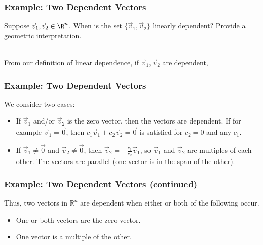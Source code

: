 \begin{frame}
\frametitle{Example: Two Dependent Vectors}

    Suppose $\vec v_1, \vec v_2 \in \R^n$. When is the set $\{\vec v_1, \vec v_2\}$ linearly dependent? Provide a geometric interpretation.
    
    \pause 
    
    \vspace{12pt}
    
     \\
    From our definition of linear dependence, if $\vec v_1, \vec v_2$ are dependent,  
    
\end{frame}





\begin{frame}
\frametitle{Example: Two Dependent Vectors}
    We consider two cases:
    \begin{itemize}
        \item<2->[1)] If $\vec v_1$ and/or $\vec v_2$ is the zero vector, then the vectors are dependent. If for example $\vec v_1 = \vec 0$, then $c_1\vec v_1 + c_2\vec v_2 = \vec 0$ is satisfied for $c_2 = 0$ and any $c_1$. 
        \item<3-> [2)] If $\vec v_1\ne \vec 0$ and $\vec v_2 \ne \vec 0$, then $\vec v_2 = -\frac{c_1}{c_2}\vec v_1$, so $\vec v_1$ and $\vec v_2$ are multiples of each other. The vectors are parallel (one vector is in the span of the other). 
    \end{itemize}

\end{frame}

\begin{frame}
\frametitle{Example: Two Dependent Vectors (continued)}

    Thus, two vectors in $\mathbb R^n$ are dependent when either or both of the following occur. 
    \begin{itemize}
        \item <2-> One or both vectors are the zero vector. 
        \item <3-> One vector is a multiple of the other. 
    \end{itemize}

\end{frame}








